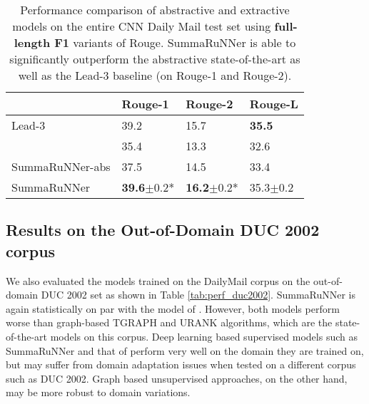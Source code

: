 \documentclass[letterpaper]{article}
\begin{document}
\begin{table}[ht]
\centering
\begin{tabular}{|l|l|l|l|}
\hline
 & Rouge-1 & Rouge-2 & Rouge-L \\
 \hline
 Lead-3 & 39.2 & 15.7 & {\bf 35.5} \\
\cite{nallapati_conll} & 35.4 & 13.3 & 32.6  \\
SummaRuNNer-abs & 37.5 & 14.5 & 33.4 \\
SummaRuNNer & {\bf 39.6}$\pm0.2$* & {\bf 16.2}$\pm0.2$* & 35.3$\pm0.2$ \\
\hline
\end{tabular}
\caption{{\small Performance comparison of abstractive and extractive models on the entire CNN Daily Mail test set using {\bf full-length F1} variants of Rouge. SummaRuNNer is able to significantly outperform the abstractive state-of-the-art as well as the Lead-3 baseline (on Rouge-1 and Rouge-2).}}
\label{tab:perf_cnndailymail}
\end{table}

\subsection{Results on the Out-of-Domain DUC 2002 corpus}

We also evaluated the models trained on the DailyMail corpus on the out-of-domain DUC 2002 set as shown in Table \ref{tab:perf_duc2002}. SummaRuNNer is again statistically on par with the model of \cite{jianpeng}. However, both models perform worse than graph-based TGRAPH \cite{tgraph} and URANK \cite{urank} algorithms, which are the state-of-the-art models on this corpus.  Deep learning based supervised models such as SummaRuNNer and that of \cite{jianpeng} perform very well on the domain they are trained on, but may suffer from domain adaptation issues when tested on a different corpus such as DUC 2002. Graph based unsupervised approaches, on the other hand, may be more robust to domain variations.
\end{document}
